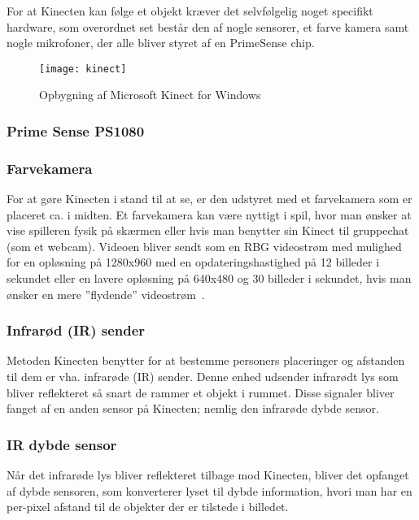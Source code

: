 For at Kinecten kan følge et objekt kræver det selvfølgelig noget specifikt hardware, som overordnet set består den af nogle sensorer, et farve kamera samt nogle mikrofoner, der alle bliver styret af en PrimeSense chip.

\begin{figure}
\centering
\texttt{[image: kinect]}
\caption{Opbygning af Microsoft Kinect for Windows}
\label{kinect:opbygning}
\end{figure}

\subsubsection{Prime Sense PS1080}

\subsubsection{Farvekamera}
For at gøre Kinecten i stand til at se, er den udstyret med et farvekamera som er placeret ca. i midten.
Et farvekamera kan være nyttigt i spil, hvor man ønsker at vise spilleren fysik på skærmen eller hvis man benytter sin Kinect til gruppechat (som et webcam).
Videoen bliver sendt som en RBG videostrøm med mulighed for en opløsning på 1280x960 med en opdateringshastighed på 12 billeder i sekundet eller en lavere opløsning på 640x480 og 30 billeder i sekundet, hvis man ønsker en mere ”flydende” videostrøm~\cite{kinectForWindowsFeatures}.

\subsubsection{Infrarød (IR) sender}
Metoden Kinecten benytter for at bestemme personers placeringer og afstanden til dem er vha. infrarøde (IR) sender.
Denne enhed udsender infrarødt lys som bliver reflekteret så snart de rammer et objekt i rummet. 
Disse signaler bliver fanget af en anden sensor på Kinecten; nemlig den infrarøde dybde sensor.

\subsubsection{IR dybde sensor}
Når det infrarøde lys bliver reflekteret tilbage mod Kinecten, bliver det opfanget af dybde sensoren, som konverterer lyset til dybde information, hvori man har en per-pixel afstand til de objekter der er tilstede i billedet.

